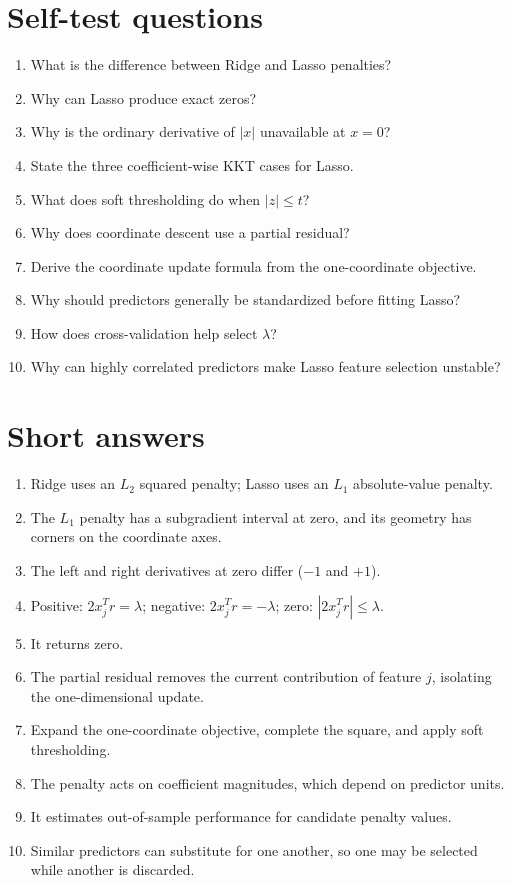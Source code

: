 \documentclass[11pt,a4paper,oneside]{book}
\newcommand{\abs}[1]{\left|#1\right|}
\begin{document}
\section{Self-test questions}
\begin{enumerate}
  \item What is the difference between Ridge and Lasso penalties?
  \item Why can Lasso produce exact zeros?
  \item Why is the ordinary derivative of $\abs{x}$ unavailable at $x=0$?
  \item State the three coefficient-wise KKT cases for Lasso.
  \item What does soft thresholding do when $\abs{z}\leq t$?
  \item Why does coordinate descent use a partial residual?
  \item Derive the coordinate update formula from the one-coordinate objective.
  \item Why should predictors generally be standardized before fitting Lasso?
  \item How does cross-validation help select $\lambda$?
  \item Why can highly correlated predictors make Lasso feature selection unstable?
\end{enumerate}

\section{Short answers}
\begin{enumerate}
  \item Ridge uses an $L_2$ squared penalty; Lasso uses an $L_1$ absolute-value penalty.
  \item The $L_1$ penalty has a subgradient interval at zero, and its geometry has corners on the coordinate axes.
  \item The left and right derivatives at zero differ ($-1$ and $+1$).
  \item Positive: $2x_j^Tr=\lambda$; negative: $2x_j^Tr=-\lambda$; zero: $\abs{2x_j^Tr}\leq\lambda$.
  \item It returns zero.
  \item The partial residual removes the current contribution of feature $j$, isolating the one-dimensional update.
  \item Expand the one-coordinate objective, complete the square, and apply soft thresholding.
  \item The penalty acts on coefficient magnitudes, which depend on predictor units.
  \item It estimates out-of-sample performance for candidate penalty values.
  \item Similar predictors can substitute for one another, so one may be selected while another is discarded.
\end{enumerate}
\end{document}
